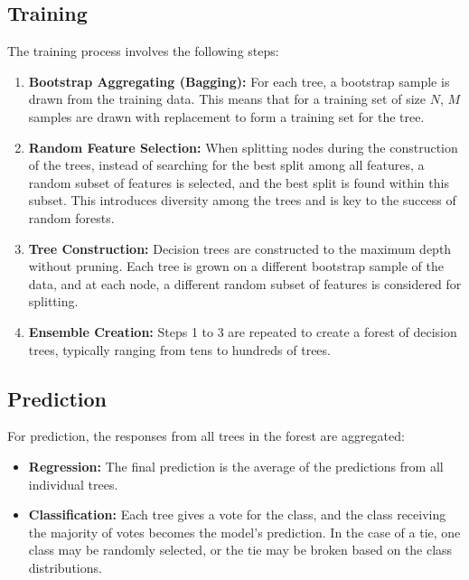 \documentclass[11pt]{article}
\begin{document}
\subsection*{Training}

The training process involves the following steps:

\begin{enumerate}
  \item \textbf{Bootstrap Aggregating (Bagging):} For each tree, a bootstrap sample is drawn from the training data. This means that for a training set of size \( N \), \( M \) samples are drawn with replacement to form a training set for the tree.
  
  \item \textbf{Random Feature Selection:} When splitting nodes during the construction of the trees, instead of searching for the best split among all features, a random subset of features is selected, and the best split is found within this subset. This introduces diversity among the trees and is key to the success of random forests.
  
  \item \textbf{Tree Construction:} Decision trees are constructed to the maximum depth without pruning. Each tree is grown on a different bootstrap sample of the data, and at each node, a different random subset of features is considered for splitting.
  
  \item \textbf{Ensemble Creation:} Steps 1 to 3 are repeated to create a forest of decision trees, typically ranging from tens to hundreds of trees.
\end{enumerate}

\subsection*{Prediction}

For prediction, the responses from all trees in the forest are aggregated:

\begin{itemize}
  \item \textbf{Regression:} The final prediction is the average of the predictions from all individual trees.
  
  \item \textbf{Classification:} Each tree gives a vote for the class, and the class receiving the majority of votes becomes the model's prediction. In the case of a tie, one class may be randomly selected, or the tie may be broken based on the class distributions.
\end{itemize}
\end{document}
